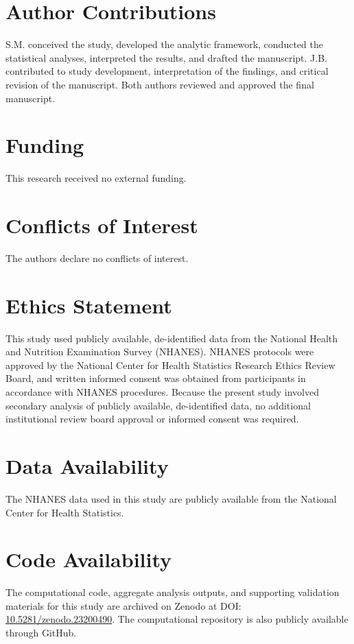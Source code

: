 \documentclass[11pt]{article}
\begin{document}
\section*{Author Contributions}

S.M. conceived the study, developed the analytic framework, conducted
the statistical analyses, interpreted the results, and drafted the
manuscript. J.B. contributed to study development, interpretation of
the findings, and critical revision of the manuscript. Both authors
reviewed and approved the final manuscript.

\section*{Funding}

This research received no external funding.

\section*{Conflicts of Interest}

The authors declare no conflicts of interest.

\section*{Ethics Statement}

This study used publicly available, de-identified data from the National
Health and Nutrition Examination Survey (NHANES). NHANES protocols were
approved by the National Center for Health Statistics Research Ethics Review
Board, and written informed consent was obtained from participants in
accordance with NHANES procedures. Because the present study involved
secondary analysis of publicly available, de-identified data, no additional
institutional review board approval or informed consent was required.

\section*{Data Availability}

The NHANES data used in this study are publicly available from the National
Center for Health Statistics.

\section*{Code Availability}

The computational code, aggregate analysis outputs, and supporting validation
materials for this study are archived on Zenodo at DOI:
\href{https://doi.org/10.5281/zenodo.23200490}{10.5281/zenodo.23200490}.
The computational repository is also publicly available through GitHub.




\end{document}
